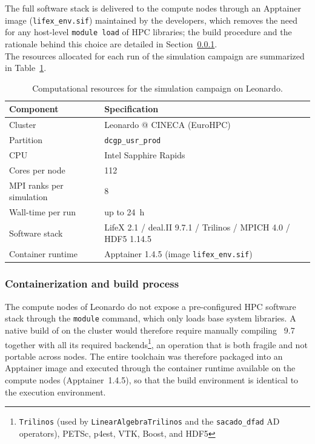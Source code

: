The full software stack is delivered to the compute nodes through an Apptainer image (\texttt{lifex\_env.sif}) maintained by the \textbf{\lifex} developers, which removes the need for any host-level \texttt{module load} of HPC libraries; the build procedure and the rationale behind this choice are detailed in Section~\ref{sec:container_build}.\\

The resources allocated for each run of the simulation campaign are summarized in Table~\ref{tab:hpc_resources}.

\begin{table}[H]
  \centering
  \begin{tabular}{ll}
    \hline
    \textbf{Component} & \textbf{Specification} \\
    \hline
    Cluster & Leonardo @ CINECA (EuroHPC) \\
    Partition & \texttt{dcgp\_usr\_prod} \\
    CPU & Intel Sapphire Rapids \\
    Cores per node & 112 \\
    MPI ranks per simulation & 8 \\
    Wall-time per run & up to 24~h \\
    Software stack & LifeX 2.1 / deal.II 9.7.1 / Trilinos / MPICH 4.0 / HDF5 1.14.5 \\
    Container runtime & Apptainer 1.4.5 (image \texttt{lifex\_env.sif}) \\
    \hline
  \end{tabular}
  \caption{Computational resources for the simulation campaign on Leonardo.}
  \label{tab:hpc_resources}
\end{table}


\subsubsection{Containerization and build process}
\label{sec:container_build}

The compute nodes of Leonardo do not expose a pre-configured HPC software stack through the \texttt{module} command, which only loads base system libraries. A native build of \textbf{\lifex} on the cluster would therefore require manually compiling \dealii~9.7 together with all its required backends\footnote{\texttt{Trilinos} (used by \texttt{LinearAlgebraTrilinos} and the \texttt{sacado\_dfad} AD operators), PETSc, p4est, VTK, Boost, and HDF5}, an operation that is both fragile and not portable across nodes. The entire toolchain was therefore packaged into an Apptainer image and executed through the container runtime available on the compute nodes (Apptainer~1.4.5), so that the build environment is identical to the execution environment.\\

